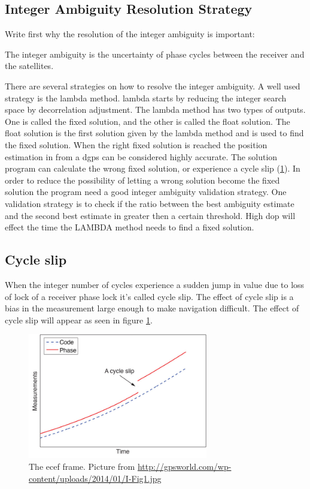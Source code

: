 \subsection{Integer Ambiguity Resolution Strategy}

Write first why the resolution of the integer ambiguity is important:

The integer ambiguity is the uncertainty of phase cycles between the receiver and the satellites.

There are several strategies on how to resolve the integer ambiguity. A well used strategy is the \gls{lambda} method. \gls{lambda} starts by reducing the integer search space by decorrelation adjustment. The \gls{lambda} method has two types of outputs. One is called the fixed solution, and the other is called the float solution. The float solution is the first solution given by the \gls{lambda} method and is used to find the fixed solution. When the right fixed solution is reached the position estimation in from a \gls{dgps} can be considered highly accurate. The solution program can calculate the wrong fixed solution, or experience a cycle slip (\ref{figure:CycleSlip}). In order to reduce the possibility of letting a wrong solution become the fixed solution the program need a good integer ambiguity validation strategy. One validation strategy is to check if the ratio between the best ambiguity estimate and the second best estimate in greater then a certain threshold. High \gls{dop} will effect the time the LAMBDA method needs to find a fixed solution.

\subsection{Cycle slip}\label{ss:cycleSlip}
When the integer number of cycles experience a sudden jump in value due to loss of lock of a receiver phase lock it's called cycle slip. The effect of cycle slip is a bias in the measurement large enough to make navigation difficult. The effect of cycle slip will appear as seen in figure \ref{figure:CycleSlip}.
\begin{figure}[H]
	\centering
		\includegraphics[width=0.7\textwidth]{figs/cycleSlip.jpg}
		\caption{The \gls{ecef} frame. Picture from \url{http://gpsworld.com/wp-content/uploads/2014/01/I-Fig1.jpg}}
		\label{figure:CycleSlip}
\end{figure}
